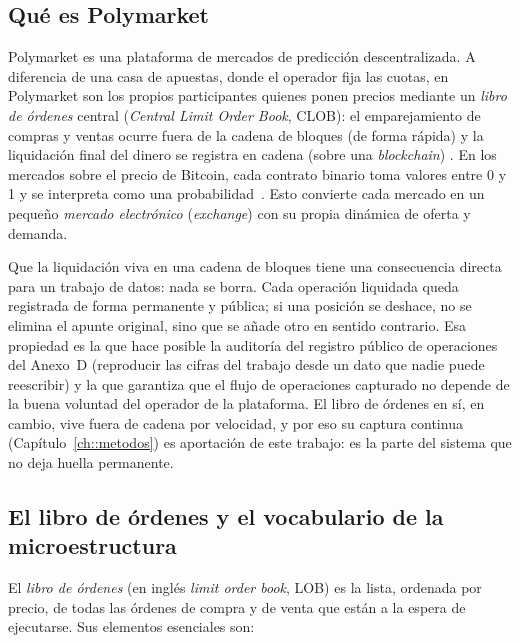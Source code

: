 \subsection{Qué es Polymarket}

Polymarket es una plataforma de mercados de predicción descentralizada. A diferencia de
una casa de apuestas, donde el operador fija las cuotas, en Polymarket son los propios
participantes quienes ponen precios mediante un \emph{libro de órdenes} central
(\emph{Central Limit Order Book}, CLOB): el emparejamiento
de compras y ventas ocurre fuera de la cadena de bloques (de forma rápida) y la
liquidación final del dinero se registra en cadena (sobre una \emph{blockchain})
\cite{polymarket_trading}. En los mercados sobre el precio de Bitcoin, cada contrato
binario toma valores entre 0 y 1 y se interpreta como una
probabilidad~\cite{polymarket_prices}. Esto convierte cada mercado en un pequeño
\emph{mercado electrónico} (\emph{exchange}) con su propia dinámica de oferta y demanda.

Que la liquidación viva en una cadena de bloques tiene una consecuencia directa para un
trabajo de datos: nada se borra. Cada operación liquidada queda registrada de forma
permanente y pública; si una posición se deshace, no se elimina el apunte original, sino
que se añade otro en sentido contrario. Esa propiedad es la que hace posible la auditoría
del registro público de operaciones del Anexo~D (reproducir las cifras del trabajo desde
un dato que nadie puede reescribir) y la que garantiza que el flujo de operaciones
capturado no depende de la buena voluntad del operador de la plataforma. El libro de
órdenes en sí, en cambio, vive fuera de cadena por velocidad, y por eso su captura
continua (Capítulo~\ref{ch::metodos}) es aportación de este trabajo: es la parte del
sistema que no deja huella permanente.

\subsection{El libro de órdenes y el vocabulario de la microestructura}

El \emph{libro de órdenes} (en inglés \emph{limit order book}, LOB) es la lista, ordenada
por precio, de todas las órdenes de compra y de venta que están a la espera de ejecutarse.
Sus elementos esenciales son:

